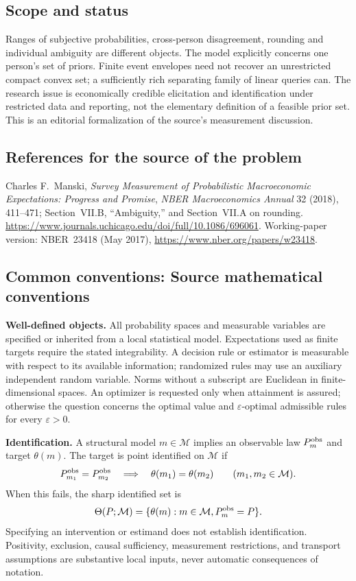 \documentclass[11pt,a4paper]{article}
\begin{document}
\subsection*{Scope and status}
Ranges of subjective probabilities, cross-person disagreement, rounding and individual ambiguity are different objects. The model explicitly concerns one person's set of priors. Finite event envelopes need not recover an unrestricted compact convex set; a sufficiently rich separating family of linear queries can. The research issue is economically credible elicitation and identification under restricted data and reporting, not the elementary definition of a feasible prior set. This is an editorial formalization of the source's measurement discussion.
\subsection*{References for the source of the problem}
Charles F.~Manski, \emph{Survey Measurement of Probabilistic Macroeconomic Expectations: Progress and Promise}, \emph{NBER Macroeconomics Annual} 32 (2018), 411--471; Section~VII.B, ``Ambiguity,'' and Section~VII.A on rounding. \url{https://www.journals.uchicago.edu/doi/full/10.1086/696061}. Working-paper version: NBER~23418 (May 2017), \url{https://www.nber.org/papers/w23418}.

\subsection*{Common conventions: Source mathematical conventions}

\textbf{Well-defined objects.}
All probability spaces and measurable variables are specified or inherited
from a local statistical model. Expectations used as finite targets require
the stated integrability. A decision rule or estimator is measurable with
respect to its available information; randomized rules may use an auxiliary
independent random variable. Norms without a subscript are Euclidean in
finite-dimensional spaces. An optimizer is requested only when attainment
is assured; otherwise the question concerns the optimal value and
$\varepsilon$-optimal admissible rules for every $\varepsilon>0$.

\textbf{Identification.}
A structural model $m\in\mathcal M$ implies an observable law
$P_m^{\rm obs}$ and target $\theta(m)$. The target is point identified on
$\mathcal M$ if
\[
 P_{m_1}^{\rm obs}=P_{m_2}^{\rm obs}
 \quad\Longrightarrow\quad\theta(m_1)=\theta(m_2)
 \qquad(m_1,m_2\in\mathcal M).
\]
When this fails, the sharp identified set is
\[
 \Theta(P;\mathcal M)=\{\theta(m):m\in\mathcal M,
                                  P_m^{\rm obs}=P\}.
\]
Specifying an intervention or estimand does not establish identification.
Positivity, exclusion, causal sufficiency, measurement restrictions, and
transport assumptions are substantive local inputs, never automatic
consequences of notation.
\end{document}
